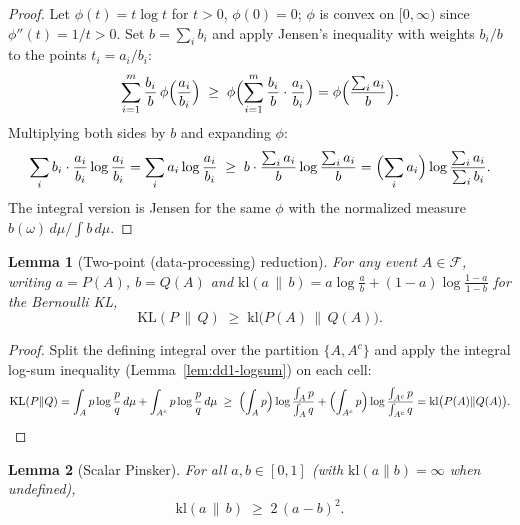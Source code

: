 \documentclass[11pt,a4paper]{article}
\theoremstyle{definition}
\theoremstyle{plain}
\newtheorem{lemma}{Lemma}[section]
\newcommand{\KL}{\mathrm{KL}}
\begin{document}
\begin{proof}
Let $\phi(t) = t \log t$ for $t > 0$, $\phi(0) = 0$; $\phi$ is convex on
$[0, \infty)$ since $\phi''(t) = 1/t > 0$. Set $b = \sum_i b_i$ and apply
Jensen's inequality with weights $b_i / b$ to the points $t_i = a_i / b_i$:
\[
\sum_{i=1}^m \frac{b_i}{b}\, \phi\Bigl( \frac{a_i}{b_i} \Bigr)
\;\ge\; \phi\Bigl( \sum_{i=1}^m \frac{b_i}{b} \cdot \frac{a_i}{b_i} \Bigr)
= \phi\Bigl( \frac{\sum_i a_i}{b} \Bigr).
\]
Multiplying both sides by $b$ and expanding $\phi$:
\[
\sum_i b_i \cdot \frac{a_i}{b_i} \log\frac{a_i}{b_i}
= \sum_i a_i \log \frac{a_i}{b_i}
\;\ge\; b \cdot \frac{\sum_i a_i}{b} \log \frac{\sum_i a_i}{b}
= \Bigl(\sum_i a_i\Bigr) \log \frac{\sum_i a_i}{\sum_i b_i}.
\]
The integral version is Jensen for the same $\phi$ with the normalized
measure $b(\omega)\,d\mu / \int b \, d\mu$.
\end{proof}

\begin{lemma}[Two-point (data-processing) reduction]
\label{lem:dd1-dataproc}
For any event $A \in \mathcal{F}$, writing $a = P(A)$, $b = Q(A)$ and
$\mathrm{kl}(a \,\|\, b) = a \log\frac{a}{b} + (1-a)\log\frac{1-a}{1-b}$ for
the Bernoulli KL,
\begin{equation}
\label{eq:dd1-dataproc}
\KL(P \,\|\, Q) \;\ge\; \mathrm{kl}\bigl( P(A) \,\|\, Q(A) \bigr).
\end{equation}
\end{lemma}

\begin{proof}
Split the defining integral over the partition $\{A, A^c\}$ and apply the
integral log-sum inequality (Lemma~\ref{lem:dd1-logsum}) on each cell:
\[
\KL(P\|Q)
= \int_A p \log \frac{p}{q}\, d\mu + \int_{A^c} p \log \frac{p}{q}\, d\mu
\;\ge\; \Bigl(\int_A p\Bigr) \log \frac{\int_A p}{\int_A q}
+ \Bigl(\int_{A^c} p\Bigr) \log \frac{\int_{A^c} p}{\int_{A^c} q}
= \mathrm{kl}\bigl(P(A) \| Q(A)\bigr). \qedhere
\]
\end{proof}

\begin{lemma}[Scalar Pinsker]
\label{lem:dd1-scalar-pinsker}
For all $a, b \in [0, 1]$ (with $\mathrm{kl}(a\|b) = \infty$ when undefined),
\begin{equation}
\label{eq:dd1-scalar-pinsker}
\mathrm{kl}(a \,\|\, b) \;\ge\; 2\,(a - b)^2 .
\end{equation}
\end{lemma}
\end{document}
